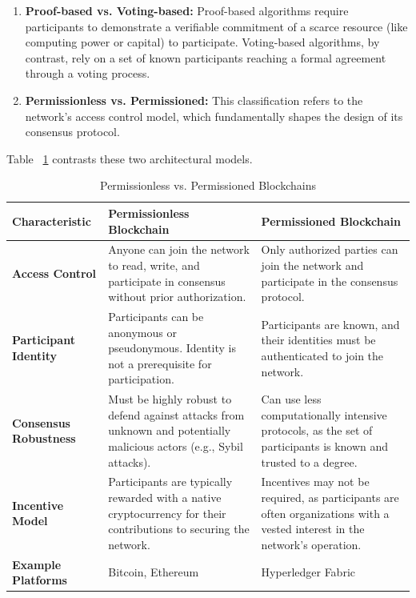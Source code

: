 \documentclass{scrbook}
\begin{document}
\begin{enumerate}
    \item \textbf{Proof-based vs. Voting-based:} Proof-based algorithms require participants to demonstrate a verifiable commitment of a scarce resource (like computing power or capital) to participate. Voting-based algorithms, by contrast, rely on a set of known participants reaching a formal agreement through a voting process.
    \item \textbf{Permissionless vs. Permissioned:} This classification refers to the network's access control model, which fundamentally shapes the design of its consensus protocol.
\end{enumerate}

Table ~\ref{tbl:permissionless_vs_permissioned_blockchains} contrasts these two architectural models. \\

\begin{table}[htbp]
    \centering
    \begin{tabular}{|p{}|p{}|p{}|}
    \hline
    \textbf{Characteristic} & \textbf{Permissionless Blockchain} & \textbf{Permissioned Blockchain} \\
    \hline
    \textbf{Access Control} & Anyone can join the network to read, write, and participate in consensus without prior authorization. & Only authorized parties can join the network and participate in the consensus protocol. \\
    \hline
    \textbf{Participant Identity} & Participants can be anonymous or pseudonymous. Identity is not a prerequisite for participation. & Participants are known, and their identities must be authenticated to join the network. \\
    \hline
    \textbf{Consensus Robustness} & Must be highly robust to defend against attacks from unknown and potentially malicious actors (e.g., Sybil attacks). & Can use less computationally intensive protocols, as the set of participants is known and trusted to a degree. \\
    \hline
    \textbf{Incentive Model} & Participants are typically rewarded with a native cryptocurrency for their contributions to securing the network. & Incentives may not be required, as participants are often organizations with a vested interest in the network's operation. \\
    \hline
    \textbf{Example Platforms} & Bitcoin, Ethereum & Hyperledger Fabric \\
    \hline
    \end{tabular}
    \caption{Permissionless vs. Permissioned Blockchains}
    \label{tbl:permissionless_vs_permissioned_blockchains}
\end{table}
\end{document}
